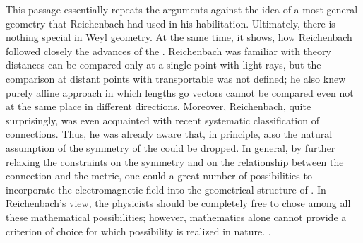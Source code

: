\documentclass[draft]{article}
\begin{document}
%
This passage essentially repeats the arguments against the idea of a most general geometry that Reichenbach had used in his habilitation. Ultimately, there is nothing special in Weyl geometry. At the same time, it shows, how Reichenbach followed closely the advances of the \uftp. Reichenbach was familiar with   theory distances can be compared only at a single point with light rays, but the comparison at distant points with transportable \rac was not defined; he also knew  purely affine approach in which lengths go vectors cannot be compared even not at the same place in different directions. Moreover, Reichenbach, quite surprisingly, was even acquainted with  recent systematic classification of connections. Thus, he was already aware that, in principle, also the natural assumption of the symmetry of the \Gtmn could be dropped. In general, by further relaxing the constraints on the symmetry and on the relationship between the connection and the metric, one could a great number of possibilities to incorporate the electromagnetic field into the geometrical structure of \spti. In Reichenbach's view, the physicists should be completely free to chose among all these mathematical possibilities; however, mathematics alone cannot provide a criterion of choice for which possibility is realized in nature. .

\end{document}
